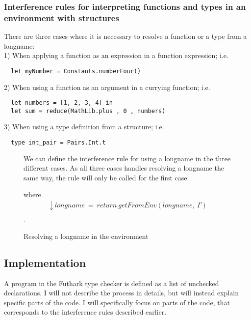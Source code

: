 \subsubsection{Interference rules for interpreting functions and types in an
  environment with structures}\label{interpretingfunctionsandtypeswithstructures}
There are three cases where it is necessary to resolve a function or a type from a
longname:\\
1) When applying a function as an expression in a function expression; i.e.
\begin{verbatim}
  let myNumber = Constants.numberFour()
\end{verbatim}
2) When using a function as an argument in a currying function; i.e.
\begin{verbatim}
  let numbers = [1, 2, 3, 4] in
  let sum = reduce(MathLib.plus , 0 , numbers)
\end{verbatim}
3) When using a type definition from a structure; i.e.
\begin{verbatim}
  type int_pair = Pairs.Int.t 
\end{verbatim}

\begin{figure}
\begin{tcolorbox}
We can define the interference rule for using a longname in the three different
cases. As all three cases handles resolving a longname the same way, the rule
will only be called for the first case:
  \begin{prooftree}
  \end{prooftree}
  where
  \begin{align*}
    \downarrow longname\ =\ return\ getFromEnv(longname ,\ \Gamma) \\
  \end{align*}.
\end{tcolorbox}
  \caption{Resolving a longname in the environment \label{RuleResolveLongname}}
\end{figure}

\subsection{Implementation}
A program in the Futhark type checker is defined as a list of unchecked
declarations.
I will not describe the process in details, but will instead
explain specific parts of the code.
I will specifically focus on parts of the code, that corresponds to the
interference rules described earlier.
\\
